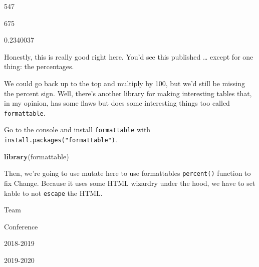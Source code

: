 \documentclass[
]{book}
\newenvironment{Shaded}{\begin{snugshade}}{\end{snugshade}}
\newcommand{\DataTypeTok}[1]{\textcolor[rgb]{0.13,0.29,0.53}{#1}}
\newcommand{\DecValTok}[1]{\textcolor[rgb]{0.00,0.00,0.81}{#1}}
\newcommand{\KeywordTok}[1]{\textcolor[rgb]{0.13,0.29,0.53}{\textbf{#1}}}
\newcommand{\NormalTok}[1]{#1}
\newcommand{\OperatorTok}[1]{\textcolor[rgb]{0.81,0.36,0.00}{\textbf{#1}}}
\newcommand{\StringTok}[1]{\textcolor[rgb]{0.31,0.60,0.02}{#1}}
\begin{document}
547

675

0.2340037

Honestly, this is really good right here. You'd see this published \ldots{} except for one thing: the percentages.

We could go back up to the top and multiply by 100, but we'd still be missing the percent sign. Well, there's another library for making interesting tables that, in my opinion, has some flaws but does some interesting things too called \texttt{formattable}.

Go to the console and install \texttt{formattable} with \texttt{install.packages("formattable")}.

\begin{Shaded}
\begin{Highlighting}[]
\KeywordTok{library}\NormalTok{(formattable)}
\end{Highlighting}
\end{Shaded}

Then, we're going to use mutate here to use formattables \texttt{percent()} function to fix Change. Because it uses some HTML wizardry under the hood, we have to set kable to not \texttt{escape} the HTML.

\begin{Shaded}
\end{Shaded}

Team

Conference

2018-2019

2019-2020
\end{document}
